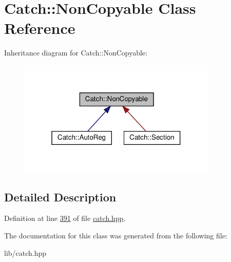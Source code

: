 \hypertarget{classCatch_1_1NonCopyable}{}\section{Catch\+::Non\+Copyable Class Reference}
\label{classCatch_1_1NonCopyable}


Inheritance diagram for Catch\+::Non\+Copyable\+:
\nopagebreak
\begin{figure}[H]
\begin{center}
\leavevmode
\includegraphics[width=268pt]{classCatch_1_1NonCopyable__inherit__graph}
\end{center}
\end{figure}


\subsection{Detailed Description}


Definition at line \mbox{\hyperlink{catch_8hpp_source_l00391}{391}} of file \mbox{\hyperlink{catch_8hpp_source}{catch.\+hpp}}.



The documentation for this class was generated from the following file\+:\begin{DoxyCompactItemize}
\item 
lib/catch.\+hpp\end{DoxyCompactItemize}
